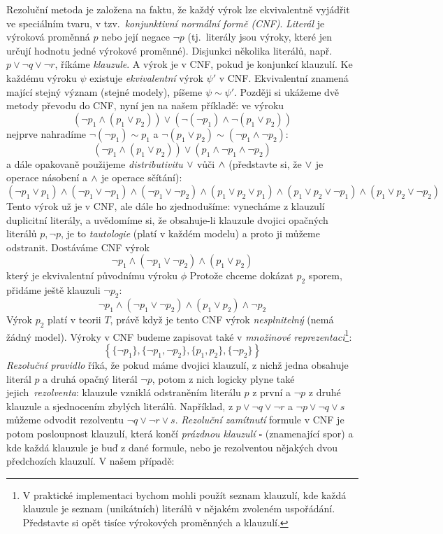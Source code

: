 Rezoluční metoda je založena na faktu, že každý výrok lze ekvivalentně vyjádřit ve speciálním tvaru, v tzv.\ \emph{konjunktivní normální formě (CNF)}. \emph{Literál} je výroková proměnná \(p\) nebo její negace \(\neg p\) (tj.\ literály jsou výroky, které jen určují hodnotu jedné výrokové proměnné). Disjunkci několika literálů, např. \( p \lor \neg q\lor \neg r\), říkáme \emph{klauzule}. A výrok je v CNF, pokud je konjunkcí klauzulí. Ke každému výroku \( \psi \) existuje \emph{ekvivalentní} výrok \( \psi' \) v {CNF}. Ekvivalentní znamená mající stejný význam (stejné modely), píšeme \( \psi \sim \psi' \). Později si ukážeme dvě metody převodu do CNF, nyní jen na našem příkladě: ve výroku
\[
    (\neg p_1 \land (p_1 \lor p_2)) \lor (\neg (\neg p_1) \land \neg (p_1 \lor p_2))
\]
nejprve nahradíme \( \neg (\neg p_1) \sim p_1 \) a \( \neg (p_1 \lor p_2) \sim (\neg p_1 \land \neg p_2) \):
\[
    (\neg p_1 \land (p_1 \lor p_2)) \lor (p_1 \land \neg p_1 \land \neg p_2)
\]
a dále opakovaně použijeme \emph{distributivitu} \( {\lor} \) vůči \( {\land} \) (představte si, že \( {\lor} \) je operace násobení a \( {\land} \) je operace sčítání):
\[
    (\neg p_1 \lor p_1) \land (\neg p_1 \lor \neg p_1) \land (\neg p_1 \lor \neg p_2) \land (p_1 \lor p_2 \lor p_1) \land (p_1 \lor p_2 \lor \neg p_1) \land (p_1 \lor p_2 \lor \neg p_2)
\]
Tento výrok už je v CNF, ale dále ho zjednodušíme: vynecháme z klauzulí duplicitní literály, a uvědomíme si, že obsahuje-li klauzule dvojici opačných literálů \( p, \neg p \), je to \emph{tautologie} (platí v každém modelu) a proto ji můžeme odstranit. Dostáváme CNF výrok
\[
    \neg p_1 \land (\neg p_1 \lor \neg p_2) \land (p_1 \lor p_2)
\]
který je ekvivalentní původnímu výroku \( \phi \)
Protože chceme dokázat \(p_2\) sporem, přidáme ještě klauzuli \(\neg p_2\):
\[
    \neg p_1 \land (\neg p_1 \lor \neg p_2) \land (p_1 \lor p_2) \land \neg p_2
\]
Výrok \(p_2\) platí v teorii \(T\), právě když je tento CNF výrok \emph{nesplnitelný} (nemá žádný model). Výroky v CNF budeme zapisovat také v \emph{množinové reprezentaci}\footnote{V praktické implementaci bychom mohli použít seznam klauzulí, kde každá klauzule je seznam (unikátních) literálů v nějakém zvoleném uspořádání. Představte si opět tisíce výrokových proměnných a klauzulí.}:
\[
    \left \{ \{\neg p_1\},\{\neg p_1,\neg p_2\},\{p_1, p_2\},\{\neg p_2\} \right \}
\]
\emph{Rezoluční pravidlo} říká, že pokud máme dvojici klauzulí, z nichž jedna obsahuje literál \(p\) a druhá opačný literál \(\neg p\), potom z nich logicky plyne také jejich\ \emph{rezolventa}: klauzule vzniklá odstraněním literálu \(p\) z první a \(\neg p\) z druhé klauzule a sjednocením zbylých literálů. Například, z \( p \lor \neg q\lor \neg r\) a \( \neg p \lor \neg q \lor s\) můžeme odvodit rezolventu \( \neg q \lor \neg r \lor s\). \emph{Rezoluční zamítnutí} formule v CNF je potom posloupnost klauzulí, která končí \emph{prázdnou klauzulí \( \square \)} (znamenající spor) a kde každá klauzule je buď z dané formule, nebo je rezolventou nějakých dvou předchozích klauzulí. V našem případě:
